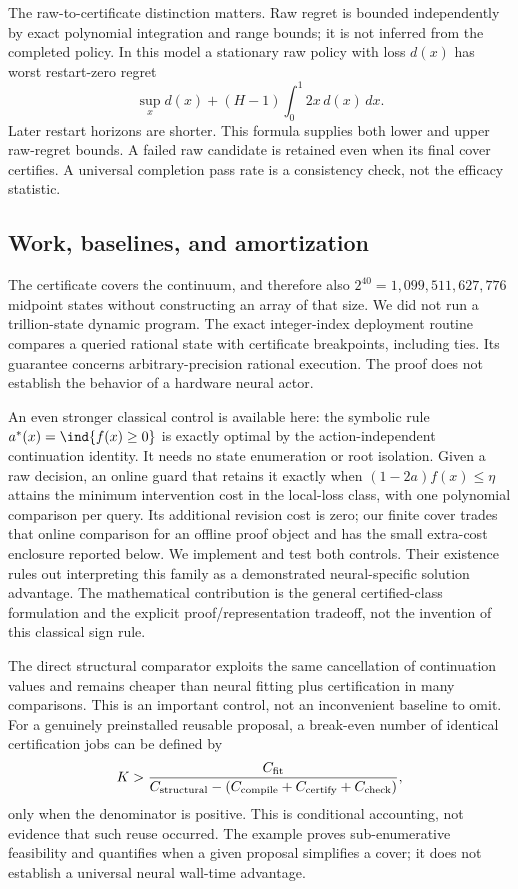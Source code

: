 

The raw-to-certificate distinction matters. Raw regret is bounded independently by exact polynomial integration and range bounds; it is not inferred from the completed policy. In this model a stationary raw policy with loss $d(x)$ has worst restart-zero regret
\begin{equation}
 \sup_x d(x)+(H-1)\int_0^1 2x\,d(x)\,dx.
\end{equation}
Later restart horizons are shorter. This formula supplies both lower and upper raw-regret bounds. A failed raw candidate is retained even when its final cover certifies. A universal completion pass rate is a consistency check, not the efficacy statistic.

\subsection{Work, baselines, and amortization}

The certificate covers the continuum, and therefore also $2^{40}=1{,}099{,}511{,}627{,}776$ midpoint states without constructing an array of that size. We did not run a trillion-state dynamic program. The exact integer-index deployment routine compares a queried rational state with certificate breakpoints, including ties. Its guarantee concerns arbitrary-precision rational execution. The proof does not establish the behavior of a hardware neural actor.

An even stronger classical control is available here: the symbolic rule $a^*(x)=\ind\{f(x)\ge0\}$ is exactly optimal by the action-independent continuation identity. It needs no state enumeration or root isolation. Given a raw decision, an online guard that retains it exactly when $(1-2a)f(x)\le\eta$ attains the minimum intervention cost in the local-loss class, with one polynomial comparison per query. Its additional revision cost is zero; our finite cover trades that online comparison for an offline proof object and has the small extra-cost enclosure reported below. We implement and test both controls. Their existence rules out interpreting this family as a demonstrated neural-specific solution advantage. The mathematical contribution is the general certified-class formulation and the explicit proof/representation tradeoff, not the invention of this classical sign rule.

The direct structural comparator exploits the same cancellation of continuation values and remains cheaper than neural fitting plus certification in many comparisons. This is an important control, not an inconvenient baseline to omit. For a genuinely preinstalled reusable proposal, a break-even number of identical certification jobs can be defined by
\begin{equation}
 K>\frac{C_{\rm fit}}{C_{\rm structural}-(C_{\rm compile}+C_{\rm certify}+C_{\rm check})},
\end{equation}
only when the denominator is positive. This is conditional accounting, not evidence that such reuse occurred. The example proves sub-enumerative feasibility and quantifies when a given proposal simplifies a cover; it does not establish a universal neural wall-time advantage.

